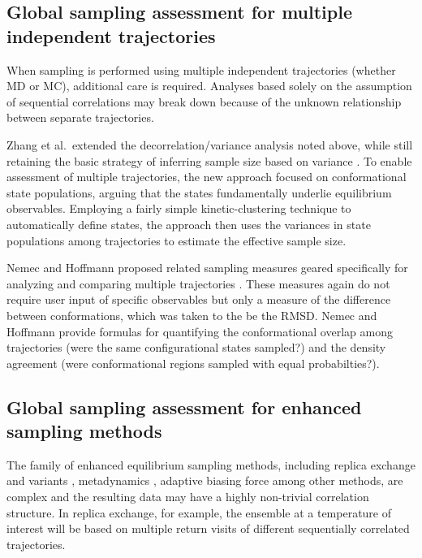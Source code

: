 \subsection{Global sampling assessment for multiple independent trajectories}
When sampling is performed using multiple independent trajectories (whether MD or MC), additional care is required.
Analyses based solely on the assumption of sequential correlations may break down because of the unknown relationship between separate trajectories.

Zhang et al.\ extended the decorrelation/variance analysis noted above, while still retaining the basic strategy of inferring sample size based on variance \cite{Zhang2010}.
To enable assessment of multiple trajectories, the new approach focused on conformational state populations, arguing that the states fundamentally underlie equilibrium observables.
Employing a fairly simple kinetic-clustering technique to automatically define states, the approach then uses the variances in state populations among trajectories to estimate the effective sample size.

Nemec and Hoffmann proposed related sampling measures geared specifically for analyzing and comparing multiple trajectories \cite{Nemec2017}.
These measures again do not require user input of specific observables but only a measure of the difference between conformations, which was taken to the be the RMSD.  
Nemec and Hoffmann provide formulas for quantifying the conformational overlap among trajectories (were the same configurational states sampled?) and the density agreement (were conformational regions sampled with equal probabilties?).


\subsection{Global sampling assessment for enhanced sampling methods}
The family of enhanced equilibrium sampling methods, including replica exchange and variants \cite{Swendsen-1986,Sugita1999,Okamoto-2000}, metadynamics \cite{Bussi2006a,Laio2008}, adaptive biasing force \cite{Darve2001,Darve2008,Comer2015} among other methods, are complex and the resulting data may have a highly non-trivial correlation structure.
In replica exchange, for example, the ensemble at a temperature of interest will be based on multiple return visits of different sequentially correlated trajectories.

